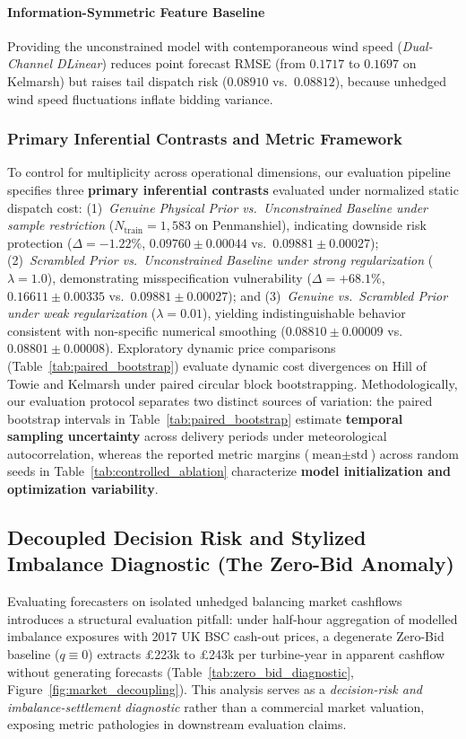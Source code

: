 \paragraph{Information-Symmetric Feature Baseline}
Providing the unconstrained model with contemporaneous wind speed (\textit{Dual-Channel DLinear}) reduces point forecast RMSE (from $0.1717$ to $0.1697$ on Kelmarsh) but raises tail dispatch risk ($0.08910$ vs.\ $0.08812$), because unhedged wind speed fluctuations inflate bidding variance.

\subsubsection{Primary Inferential Contrasts and Metric Framework}
To control for multiplicity across operational dimensions, our evaluation pipeline specifies three \textbf{primary inferential contrasts} evaluated under normalized static dispatch cost:
(1)~\textit{Genuine Physical Prior vs.\ Unconstrained Baseline under sample restriction} ($N_{\text{train}}=1{,}583$ on Penmanshiel), indicating downside risk protection ($\Delta = -1.22\%$, $0.09760 \pm 0.00044$ vs.\ $0.09881 \pm 0.00027$);
(2)~\textit{Scrambled Prior vs.\ Unconstrained Baseline under strong regularization} ($\lambda=1.0$), demonstrating misspecification vulnerability ($\Delta = +68.1\%$, $0.16611 \pm 0.00335$ vs.\ $0.09881 \pm 0.00027$); and
(3)~\textit{Genuine vs.\ Scrambled Prior under weak regularization} ($\lambda=0.01$), yielding indistinguishable behavior consistent with non-specific numerical smoothing ($0.08810 \pm 0.00009$ vs.\ $0.08801 \pm 0.00008$).
Exploratory dynamic price comparisons (Table~\ref{tab:paired_bootstrap}) evaluate dynamic cost divergences on Hill of Towie and Kelmarsh under paired circular block bootstrapping. Methodologically, our evaluation protocol separates two distinct sources of variation: the paired bootstrap intervals in Table~\ref{tab:paired_bootstrap} estimate \textbf{temporal sampling uncertainty} across delivery periods under meteorological autocorrelation, whereas the reported metric margins ($\text{mean} \pm \text{std}$) across random seeds in Table~\ref{tab:controlled_ablation} characterize \textbf{model initialization and optimization variability}.



\subsection{Decoupled Decision Risk and Stylized Imbalance Diagnostic (The Zero-Bid Anomaly)}
Evaluating forecasters on isolated unhedged balancing market cashflows introduces a structural evaluation pitfall: under half-hour aggregation of modelled imbalance exposures with 2017 UK BSC cash-out prices, a degenerate Zero-Bid baseline ($q \equiv 0$) extracts \pounds 223k to \pounds 243k per turbine-year in apparent cashflow without generating forecasts (Table~\ref{tab:zero_bid_diagnostic}, Figure~\ref{fig:market_decoupling}). This analysis serves as a \textit{decision-risk and imbalance-settlement diagnostic} rather than a commercial market valuation, exposing metric pathologies in downstream evaluation claims.


